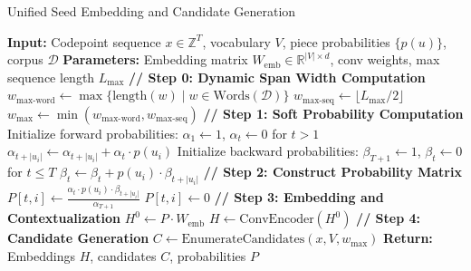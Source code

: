 \begin{algorithm}[H]
	\caption{Unified Seed Embedding and Candidate Generation}
	\label{alg:seed-embedding-pipeline}
	\begin{algorithmic}[1]
		\STATE \textbf{Input:} Codepoint sequence \(x \in \mathbb{Z}^T\), vocabulary \(V\), 
		\STATE \qquad piece probabilities \(\{p(u)\}\), corpus \(\mathcal{D}\)
		\STATE \textbf{Parameters:} Embedding matrix \(W_{\mathrm{emb}} \in \mathbb{R}^{|V| \times d}\), 
		\STATE \qquad conv weights, max sequence length \(L_{\max}\)
		\STATE
		\STATE \textbf{// Step 0: Dynamic Span Width Computation}
		\STATE \(w_{\text{max-word}} \leftarrow \max\{\text{length}(w) \mid w \in \text{Words}(\mathcal{D})\}\)
		\STATE \(w_{\text{max-seq}} \leftarrow \lfloor L_{\max} / 2 \rfloor\)
		\STATE \(w_{\max} \leftarrow \min(w_{\text{max-word}}, w_{\text{max-seq}})\)
		\STATE
		\STATE \textbf{// Step 1: Soft Probability Computation}
		\STATE Initialize forward probabilities: \(\alpha_1 \leftarrow 1\), 
		\STATE \qquad \(\alpha_t \leftarrow 0\) for \(t > 1\)
		\STATE \(\alpha_{t + |u_i|} \leftarrow \alpha_{t + |u_i|} + \alpha_t \cdot p(u_i)\)
		\ENDFOR
		\ENDFOR
		\STATE
		\STATE Initialize backward probabilities: \(\beta_{T+1} \leftarrow 1\), 
		\STATE \qquad \(\beta_t \leftarrow 0\) for \(t \leq T\)
		\STATE \(\beta_t \leftarrow \beta_t + p(u_i) \cdot \beta_{t + |u_i|}\)
		\ENDFOR
		\ENDFOR
		\STATE
		\STATE \textbf{// Step 2: Construct Probability Matrix}
		\STATE \(P[t, i] \leftarrow \frac{\alpha_t \cdot p(u_i) \cdot \beta_{t + |u_i|}}{\alpha_{T+1}}\)
		\ELSE
		\STATE \(P[t, i] \leftarrow 0\)
		\ENDIF
		\ENDFOR
		\ENDFOR
		\STATE
		\STATE \textbf{// Step 3: Embedding and Contextualization}
		\STATE \(H^0 \leftarrow P \cdot W_{\mathrm{emb}}\) 
		\STATE \(H \leftarrow \text{ConvEncoder}(H^0)\) 
		\STATE
		\STATE \textbf{// Step 4: Candidate Generation}
		\STATE \(C \leftarrow \text{EnumerateCandidates}(x, V, w_{\max})\) 
		\STATE \qquad {}
		\STATE
		\STATE \textbf{Return:} Embeddings \(H\), candidates \(C\), probabilities \(P\)
	\end{algorithmic}
\end{algorithm}

